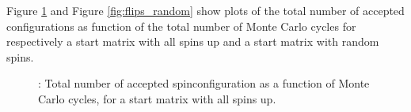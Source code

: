 \documentclass{article}
\begin{document}
{{Figure \ref{fig:flips} and Figure \ref{fig:flips_random} show plots of the total number of accepted configurations as function of the total number of Monte Carlo cycles for respectively a start matrix with all spins up and a start matrix with random spins.

\begin{figure}[H]
\caption{: Total number of accepted spinconfiguration as a function of Monte Carlo cycles, for a start matrix with all spins up. }
\label{fig:flips}
\end{figure}

}}
\end{document}
